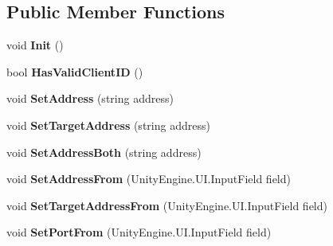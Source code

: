 \subsection*{Public Member Functions}
\begin{DoxyCompactItemize}
\item 
\hypertarget{class_skyrates_1_1_common_1_1_network_1_1_session_a0e3d58056a718d1201d1052d74c56758}{void {\bfseries Init} ()}\label{class_skyrates_1_1_common_1_1_network_1_1_session_a0e3d58056a718d1201d1052d74c56758}

\item 
\hypertarget{class_skyrates_1_1_common_1_1_network_1_1_session_a8064e0d263971a7deda7b74d1854b317}{bool {\bfseries Has\-Valid\-Client\-I\-D} ()}\label{class_skyrates_1_1_common_1_1_network_1_1_session_a8064e0d263971a7deda7b74d1854b317}

\item 
\hypertarget{class_skyrates_1_1_common_1_1_network_1_1_session_a21625ce49e9ec871f794e8d1c7f0245a}{void {\bfseries Set\-Address} (string address)}\label{class_skyrates_1_1_common_1_1_network_1_1_session_a21625ce49e9ec871f794e8d1c7f0245a}

\item 
\hypertarget{class_skyrates_1_1_common_1_1_network_1_1_session_a3cf672cdbcb6e71efdacd565e1040cf7}{void {\bfseries Set\-Target\-Address} (string address)}\label{class_skyrates_1_1_common_1_1_network_1_1_session_a3cf672cdbcb6e71efdacd565e1040cf7}

\item 
\hypertarget{class_skyrates_1_1_common_1_1_network_1_1_session_a9145cab59f183e2c6893819e4e623201}{void {\bfseries Set\-Address\-Both} (string address)}\label{class_skyrates_1_1_common_1_1_network_1_1_session_a9145cab59f183e2c6893819e4e623201}

\item 
\hypertarget{class_skyrates_1_1_common_1_1_network_1_1_session_ad868f465eb7d404b6a71a9b5b4c599d5}{void {\bfseries Set\-Address\-From} (Unity\-Engine.\-U\-I.\-Input\-Field field)}\label{class_skyrates_1_1_common_1_1_network_1_1_session_ad868f465eb7d404b6a71a9b5b4c599d5}

\item 
\hypertarget{class_skyrates_1_1_common_1_1_network_1_1_session_a1f9edda8349bb12ba5437fedb77db865}{void {\bfseries Set\-Target\-Address\-From} (Unity\-Engine.\-U\-I.\-Input\-Field field)}\label{class_skyrates_1_1_common_1_1_network_1_1_session_a1f9edda8349bb12ba5437fedb77db865}

\item 
\hypertarget{class_skyrates_1_1_common_1_1_network_1_1_session_a764278ea696340505adeb6a927f46458}{void {\bfseries Set\-Port\-From} (Unity\-Engine.\-U\-I.\-Input\-Field field)}\label{class_skyrates_1_1_common_1_1_network_1_1_session_a764278ea696340505adeb6a927f46458}

\end{DoxyCompactItemize}
